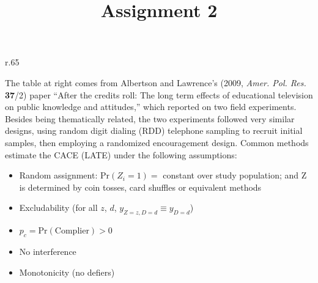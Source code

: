 \documentclass{article}
\title{Assignment 2}
\begin{document}
\maketitle

\begin{minipage}{1.0\linewidth}

\begin{wrapfigure}{r}{.65\linewidth}
\end{wrapfigure}

The table at right comes from Albertson and Lawrence's (2009, \textit{Amer. Pol. Res.} \textbf{37}/2) paper ``After the credits roll: The long term effects of educational television on public knowledge and attitudes,'' which reported on two field experiments. Besides being thematically related, the two experiments followed very similar designs, using random digit dialing (RDD) telephone sampling to recruit initial samples, then employing a randomized encouragement design.  Common methods estimate the CACE (LATE) under the following assumptions:

\begin{itemize}
\item Random assignment: $\mathrm{Pr}(Z_{i}=1) = $ constant over study population;  and $\mathrm{Z} $ is determined by coin tosses, card shuffles or equivalent methods
\item Excludability (for all $z$, $d$, $y_{Z=z, D=d} \equiv y_{D=d}$)
\item $p_{c} = \mathrm{Pr}(\mathrm{Complier}) > 0$ 
\item No interference 
\item Monotonicity (no defiers) 
\end{itemize}
  
\end{minipage}
\vspace{4ex}
\end{document}
